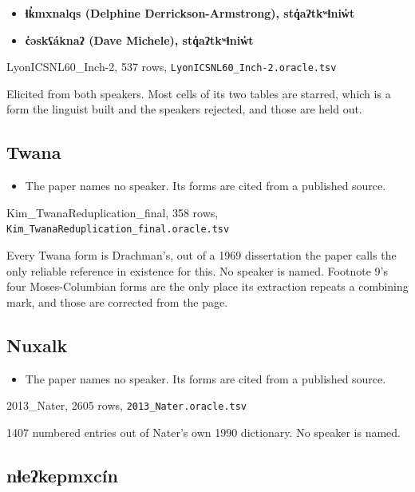 \begin{itemize}
\item \textbf{ɬk̓mxnalqs (Delphine Derrickson-Armstrong), stq̓aʔtkʷɬniw̓t}
\item \textbf{c̓əskʕáknaʔ (Dave Michele), stq̓aʔtkʷɬniw̓t}
\end{itemize}

LyonICSNL60\_Inch-2, 537 rows, \texttt{Lyon\allowbreak{}ICSNL60\_\allowbreak{}Inch-\allowbreak{}2.\allowbreak{}oracle.\allowbreak{}tsv}

Elicited from both speakers. Most cells of its two tables are starred, which is a form the linguist built and the speakers rejected, and those are held out.

\subsection{Twana}

\begin{itemize}
\item The paper names no speaker. Its forms are cited from a published source.
\end{itemize}

Kim\_TwanaReduplication\_final, 358 rows, \texttt{Kim\_\allowbreak{}Twana\allowbreak{}Reduplication\_\allowbreak{}final.\allowbreak{}oracle.\allowbreak{}tsv}

Every Twana form is Drachman's, out of a 1969 dissertation the paper calls the only reliable reference in existence for this. No speaker is named. Footnote 9's four Moses-Columbian forms are the only place its extraction repeats a combining mark, and those are corrected from the page.

\subsection{Nuxalk}

\begin{itemize}
\item The paper names no speaker. Its forms are cited from a published source.
\end{itemize}

2013\_Nater, 2605 rows, \texttt{2013\_\allowbreak{}Nater.\allowbreak{}oracle.\allowbreak{}tsv}

1407 numbered entries out of Nater's own 1990 dictionary. No speaker is named.

\subsection{nɬeʔkepmxcín}


